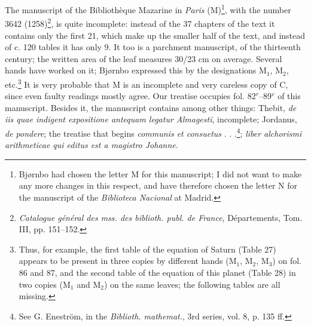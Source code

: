 \documentclass[11pt]{article}
\newcommand{\Pg}[1]{\marginpar{\footnotesize\color{gray}#1}}
\begin{document}
\par \Pg{XI}The manuscript of the Bibliothèque Mazarine in \emph{Paris} (M)\footnote{Bjørnbo had chosen the letter M for this manuscript; I did not want to make any more changes in this respect, and have therefore chosen the letter N for the manuscript of the \emph{Biblioteca Nacional} at Madrid.}, with the number 3642 (1258)\footnote{\emph{Catalogue général des mss. des biblioth. publ. de France}, Départements, Tom. III, pp. 151–152.}, is quite incomplete: instead of the 37 chapters of the text it contains only the first 21, which make up the smaller half of the text, and instead of c. 120 tables it has only 9. It too is a parchment manuscript, of the thirteenth century; the written area of the leaf measures 30/23 cm on average. Several hands have worked on it; Bjørnbo expressed this by the designations M$_{1}$, M$_{2}$, etc.\footnote{Thus, for example, the first table of the equation of Saturn (Table 27) appears to be present in three copies by different hands (M$_{1}$, M$_{2}$, M$_{3}$) on fol. 86 and 87, and the second table of the equation of this planet (Table 28) in two copies (M$_{1}$ and M$_{2}$) on the same leaves; the following tables are all missing.} It is very probable that M is an incomplete and very careless copy of C, since even faulty readings mostly agree. Our treatise occupies fol. 82$^{r}$–89$^{v}$ of this manuscript. Besides it, the manuscript contains among other things: Thebit, \emph{de iis quae indigent expositione antequam legatur Almagesti}, incomplete; Jordanus, \emph{de pondere}; the treatise that begins \emph{communis et consuetus} . . .\footnote{See G. Eneström, in the \emph{Biblioth. mathemat.}, 3rd series, vol. 8, p. 135 ff.}; \emph{liber alchorismi arithmeticae qui editus est a magistro Johanne}.\par
\end{document}
